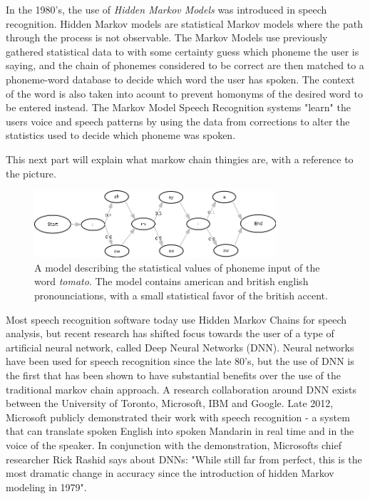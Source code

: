 In the 1980's, the use of \emph{Hidden Markov Models} was introduced in speech recognition\cite{rabiner1986introduction}. Hidden Markov models are statistical Markov models where the path through the process is not observable. The Markov Models use previously gathered statistical data to with some certainty guess which phoneme the user is saying, and the chain of phonemes considered to be correct are then matched to a phoneme-word database to decide which word the user has spoken. The context of the word is also taken into acount to prevent homonyms of the desired word to be entered instead. The Markov Model Speech Recognition systems "learn" the users voice and speech patterns by using the data from corrections to alter the statistics used to decide which phoneme was spoken. 

This next part will explain what markow chain thingies are, with a reference to the picture.

\begin{figure}[]
\includegraphics[width=0.8\textwidth] {bilder/tomato.jpg}
\caption{A model describing the statistical values of phoneme input of the word \emph{tomato}. The model contains american and british english pronounciations, with a small statistical favor of the british accent.}
\label{ibooks}
\end{figure}

Most speech recognition software today use Hidden Markov Chains for speech analysis\cite{DNN}, but recent research has shifted focus towards the user of a type of artificial neural network, called Deep Neural Networks (DNN). Neural networks have been used for speech recognition since the late 80's, but the use of DNN is the first that has been shown to have substantial benefits over the use of the traditional markov chain approach. A research collaboration around DNN exists between the University of Toronto, Microsoft, IBM and Google. Late 2012, Microsoft publicly demonstrated their work with speech recognition - a system that can translate spoken English into spoken Mandarin in real time and in the voice of the speaker. In conjunction with the demonstration, Microsofts chief researcher Rick Rashid says about DNNs: "While still far from perfect, this is the most dramatic change in accuracy since the introduction of hidden Markov modeling in 1979"\cite{chin}.

